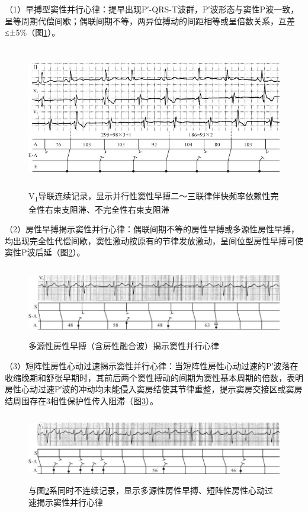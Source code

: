 （1）早搏型窦性并行心律：提早出现P′-QRS-T波群，P′波形态与窦性P波一致，呈等周期代偿间歇；偶联间期不等，两异位搏动的间距相等或呈倍数关系，互差≤±5\%（图\ref{fig16-1}）。

\begin{figure}[!htbp]
 \centering
 \includegraphics[width=5.65625in,height=2.47917in]{./images/Image00277.jpg}
 \captionsetup{justification=centering}
 \caption{V\textsubscript{1}导联连续记录，显示并行性窦性早搏二～三联律伴快频率依赖性完全性右束支阻滞、不完全性右束支阻滞}
 \label{fig16-1}
  \end{figure} 


（2）房性早搏揭示窦性并行心律：偶联间期不等的房性早搏或多源性房性早搏，均出现完全性代偿间歇，窦性激动按原有的节律发放激动，呈间位型房性早搏可使窦性P波后延（图\ref{fig16-2}）。

\begin{figure}[!htbp]
 \centering
 \includegraphics[width=5.80208in,height=1.25in]{./images/Image00278.jpg}
 \captionsetup{justification=centering}
 \caption{多源性房性早搏（含房性融合波）揭示窦性并行心律}
 \label{fig16-2}
  \end{figure} 

（3）短阵性房性心动过速揭示窦性并行心律：当短阵性房性心动过速的P′波落在收缩晚期和舒张早期时，其前后两个窦性搏动的间期为窦性基本周期的倍数，表明房性心动过速P′波的冲动均未能侵入窦房结使其节律重整，提示窦房交接区或窦房结周围存在3相性保护性传入阻滞（图\ref{fig16-3}）。

\begin{figure}[!htbp]
 \centering
 \includegraphics[width=5.77083in,height=1.17708in]{./images/Image00279.jpg}
 \captionsetup{justification=centering}
 \caption{与图\ref{fig16-2}系同时不连续记录，显示多源性房性早搏、短阵性房性心动过速揭示窦性并行心律}
 \label{fig16-3}
  \end{figure} 


